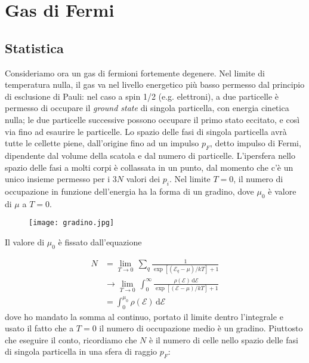 \documentclass[a4paper]{report}
\begin{document}
\section{Gas di Fermi}

\subsection{Statistica}

Consideriamo ora un gas di fermioni fortemente degenere. Nel limite di temperatura nulla, il gas va nel livello energetico più basso permesso dal principio di esclusione di Pauli: nel caso a spin 1/2 (e.g. elettroni), a due particelle è permesso di occupare il \textit{ground state} di singola particella, con energia cinetica nulla; le due particelle successive possono occupare il primo stato eccitato, e così via fino ad esaurire le particelle. Lo spazio delle fasi di singola particella avrà tutte le cellette piene, dall'origine fino ad un impulso $p_F$, detto impulso di Fermi, dipendente dal volume della scatola e dal numero di particelle. L'ipersfera nello spazio delle fasi a molti corpi è collassata in un punto, dal momento che c'è un unico insieme permesso per i $3N$ valori dei $p_i$. 
Nel limite $T=0$, il numero di occupazione in funzione dell'energia ha la forma di un gradino, dove $\mu_0$ è valore di $\mu$ a $T=0$. 

\begin{figure}[h!]
    \centering
    \texttt{[image: gradino.jpg]}
    \label{fig:my_label}
\end{figure}

\newpage
Il valore di $\mu_0$ è fissato dall'equazione

\begin{equation}
\begin{split}
    N & = \lim_{T \to 0}\, \sum_q \frac{1}{\exp\left[(\mathcal{E}_q-\mu)/k T\right]+1}\\
    & \rightarrow \lim_{T \to 0}\,\int_{0}^{\infty} \frac{\rho(\mathcal{E})\,\mathrm{d}\mathcal{E}}{\exp[(\mathcal{E}-\mu)/k T]+1} \\
    & = \int_{0}^{\mu_0} \rho(\mathcal{E})\,\mathrm{d}\mathcal{E}
\end{split}
\end{equation}
dove ho mandato la somma al continuo, portato il limite dentro l'integrale e usato il fatto che a $T=0$ il numero di occupazione medio è un gradino. Piuttosto che eseguire il conto, ricordiamo che $N$ è il numero di celle nello spazio delle fasi di singola particella in una sfera di raggio $p_F$:
\end{document}
